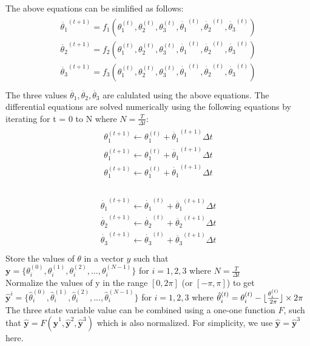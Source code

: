 The above equations can be simlified as follows:
\begin{align}
\begin{split}
\ddot{\theta_{1}}^{(t+1)} = f_{1}(\theta^{(t)}_{1}, \theta^{(t)}_{2}, \theta^{(t)}_{3},\dot{\theta_{1}}^{(t)},\dot{\theta_{2}}^{(t)}, \dot{\theta_{3}}^{(t)}) \\
\ddot{\theta_{2}}^{(t+1)} = f_{2}(\theta^{(t)}_{1}, \theta^{(t)}_{2}, \theta^{(t)}_{3},\dot{\theta_{1}}^{(t)},\dot{\theta_{2}}^{(t)}, \dot{\theta_{3}}^{(t)})\\
\ddot{\theta_{3}}^{(t+1)} = f_{3}(\theta^{(t)}_{1}, \theta^{(t)}_{2}, \theta^{(t)}_{3},\dot{\theta_{1}}^{(t)},\dot{\theta_{2}}^{(t)}, \dot{\theta_{3}}^{(t)})\\  
\end{split}
\end{align}
The three values $\ddot{\theta_{1}},\ddot{\theta_{2}},\ddot{\theta_{3}}$ are calulated using the above equations.
The differential equations are solved numerically using the following equations by iterating for t = 0 to N where $N=\frac{T}{\Delta t}$:
\begin{align}
\begin{split}
\theta^{(t+1)}_{1} \leftarrow \theta^{(t)}_{1} + \dot{\theta_{1}}^{(t+1)}\Delta t \\
\theta^{(t+1)}_{1} \leftarrow \theta^{(t)}_{1} + \dot{\theta_{1}}^{(t+1)}\Delta t \\
\theta^{(t+1)}_{1} \leftarrow \theta^{(t)}_{1} + \dot{\theta_{1}}^{(t+1)}\Delta t \\  
\end{split}
\end{align}

\begin{align}
\begin{split}
\dot{\theta_{1}}^{(t+1)} \leftarrow \dot{\theta_{1}}^{(t)} + \ddot{\theta_{1}}^{(t+1)}\Delta t \\
\dot{\theta_{2}}^{(t+1)} \leftarrow \dot{\theta_{2}}^{(t)} + \ddot{\theta_{2}}^{(t+1)}\Delta t \\
\dot{\theta_{3}}^{(t+1)} \leftarrow \dot{\theta_{3}}^{(t)} + \ddot{\theta_{3}}^{(t+1)}\Delta t \\  
\end{split}
\end{align}
Store the values of $\theta$ in a vector $y$ such that\\
$\textbf{y} = \{\theta^{(0)}_{i},\theta^{(1)}_{i},\theta^{(2)}_{i}, ... ,\theta^{(N-1)}_{i}\}$ for $i = 1,2,3$ where $N=\frac{T}{\Delta t}$\\
Normalize the values of y in the range $[0,2\pi]$ (or $[-\pi,\pi]$) to get\\ 
$\hat{\textbf{y}}^{i} = \{\hat{\theta}^{(0)}_{i},\hat{\theta}^{(1)}_{i},\hat{\theta}^{(2)}_{i}, ... ,\hat{\theta}^{(N-1)}_{i}\}$ for  $i = 1,2,3$
where $\hat{\theta}^{(t)}_{i} = \theta^{(t)}_{i} - \lfloor\frac{\theta^{(t)}_{i}}{2\pi}\rfloor\times 2\pi$\\
The three state variable value can be combined using a one-one function $F$, such that $\hat{\textbf{y}}  = F(\hat{\textbf{y}}^{1},\hat{\textbf{y}}^{2},\hat{\textbf{y}}^{3})$ which is also normalized. For simplicity, we use $\hat{\textbf{y}} = \hat{\textbf{y}}^{3}$ here.

